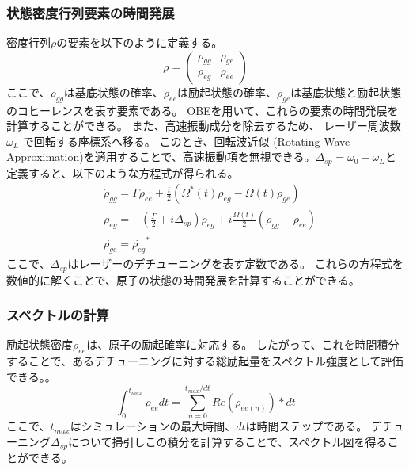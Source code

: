 \subsubsection{状態密度行列要素の時間発展}
    密度行列$\rho$の要素を以下のように定義する。
    \begin{equation}
        \rho = \begin{pmatrix}
        \rho_{gg} & \rho_{ge} \\
        \rho_{eg} & \rho_{ee}
        \end{pmatrix}
    \end{equation}
    ここで、$\rho_{gg}$は基底状態の確率、$\rho_{ee}$は励起状態の確率、$\rho_{ge}$は基底状態と励起状態のコヒーレンスを表す要素である。
    OBEを用いて、これらの要素の時間発展を計算することができる。
    また、高速振動成分を除去するため、 レーザー周波数 $\omega_L$ で回転する座標系へ移る。
    このとき、回転波近似 (Rotating Wave Approximation)を適用することで、高速振動項を無視できる。$\Delta_{sp} = \omega_0 - \omega_L$と定義すると、以下のような方程式が得られる。
    \begin{align}
        &\dot{\rho}_{gg}=\Gamma\rho_{ee}+\frac{i}{2}\left(\Omega^*(t)\rho_{eg}-\Omega(t)\rho_{ge}\right)\\
        &\dot{\rho_{eg}} = -(\frac{\Gamma}{2} + i\Delta_{sp})\rho_{eg} + i\frac{\Omega(t)}{2}(\rho_{gg}-\rho_{ee})\\
        &\dot{\rho_{ge}} = \dot{\rho_{eg}}^*
    \end{align}
    ここで、$\Delta_{sp}$はレーザーのデチューニングを表す定数である。
    これらの方程式を数値的に解くことで、原子の状態の時間発展を計算することができる。
\subsubsection{スペクトルの計算}
    励起状態密度$\rho_{ee}$は、原子の励起確率に対応する。
    したがって、これを時間積分することで、あるデチューニングに対する総励起量をスペクトル強度として評価できる。。
    \begin{equation}
        \int_0^{t_{max}} \rho_{ee} dt = \sum_{n=0}^{t_{max}/dt} Re(\rho_{ee(n)}) * dt
    \end{equation}
    ここで、$t_{max}$はシミュレーションの最大時間、$dt$は時間ステップである。
    デチューニング$\Delta_{sp}$について掃引しこの積分を計算することで、スペクトル図を得ることができる。
